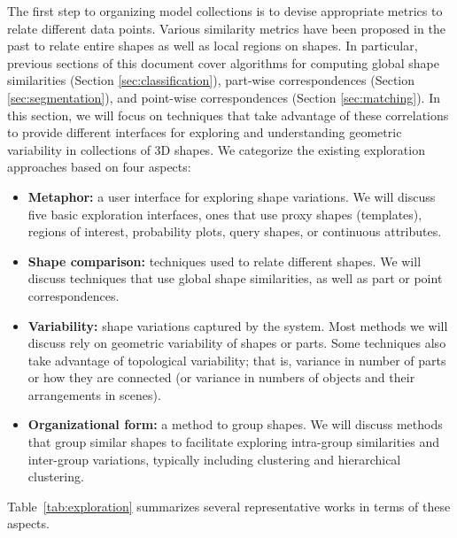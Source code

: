 The first step to organizing model collections is to devise appropriate metrics to relate different data points. Various similarity metrics have been proposed in the past to relate entire shapes as well as local regions on shapes. In particular, previous sections of this document cover algorithms for computing global shape similarities (Section \ref{sec:classification}), part-wise correspondences (Section \ref{sec:segmentation}), and point-wise correspondences (Section \ref{sec:matching}). In this section, we will focus on techniques that take advantage of these correlations to provide different interfaces for exploring and understanding geometric variability in collections of 3D shapes.
We categorize the existing exploration approaches based on four aspects:
\begin{itemize}
\item \textbf{Metaphor:} a user interface for exploring shape variations. We will discuss five basic exploration interfaces, ones that use proxy shapes (templates), regions of interest, probability plots, query shapes, or continuous attributes.
\item \textbf{Shape comparison:} techniques used to relate different shapes. We will discuss techniques that use global shape similarities, as well as part or point correspondences.
\item \textbf{Variability:} shape variations captured by the system. Most methods we will discuss rely on geometric variability of shapes or parts. Some techniques also take advantage of topological variability; that is, variance in number of parts or how they are connected (or variance in numbers of objects and their arrangements in scenes).
\item \textbf{Organizational form:} a method to group shapes. We will discuss methods that group similar shapes to facilitate exploring intra-group similarities and inter-group variations, typically including clustering and hierarchical clustering.
\end{itemize}
Table~\ref{tab:exploration} summarizes several representative works in terms of these  aspects.

